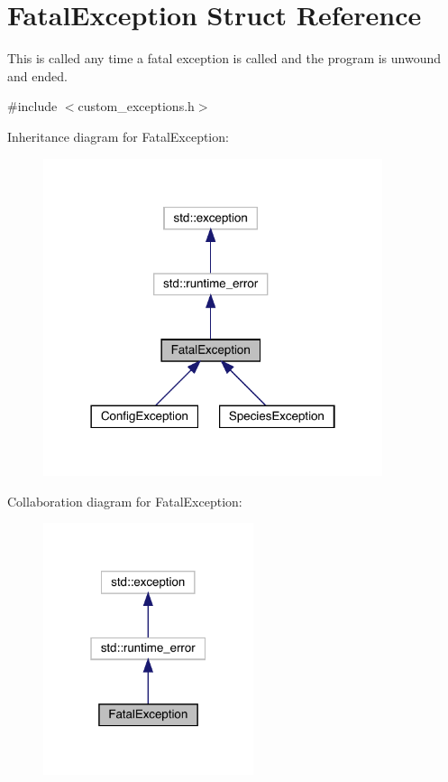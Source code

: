 \hypertarget{struct_fatal_exception}{}\section{Fatal\+Exception Struct Reference}
\label{struct_fatal_exception}


This is called any time a fatal exception is called and the program is unwound and ended.  




{\ttfamily \#include $<$custom\+\_\+exceptions.\+h$>$}



Inheritance diagram for Fatal\+Exception\+:
\nopagebreak
\begin{figure}[H]
\begin{center}
\leavevmode
\includegraphics[width=282pt]{struct_fatal_exception__inherit__graph}
\end{center}
\end{figure}


Collaboration diagram for Fatal\+Exception\+:
\nopagebreak
\begin{figure}[H]
\begin{center}
\leavevmode
\includegraphics[width=175pt]{struct_fatal_exception__coll__graph}
\end{center}
\end{figure}
